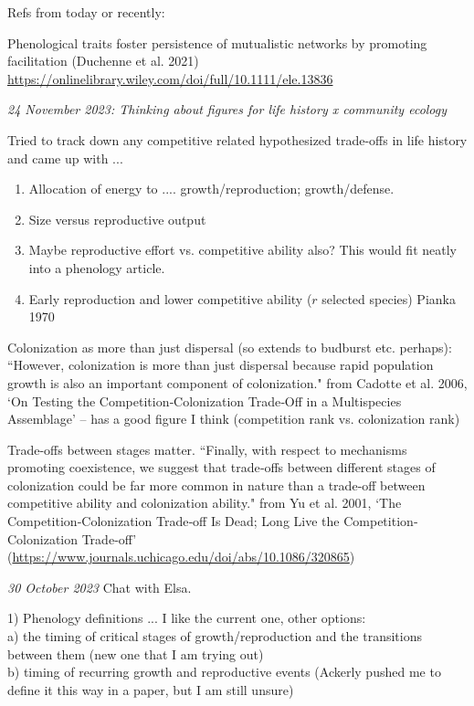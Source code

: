 \documentclass[11pt]{article}
\begin{document}
Refs from today or recently:

Phenological traits foster persistence of mutualistic networks by promoting facilitation (Duchenne et al. 2021) \url{https://onlinelibrary.wiley.com/doi/full/10.1111/ele.13836}

\emph{24 November 2023: Thinking about figures for life history x community ecology} 

Tried to track down any competitive related hypothesized trade-offs in life history and came up with ... 
\begin{enumerate}
\item Allocation of energy to .... growth/reproduction; growth/defense.
\item Size versus reproductive output
\item Maybe reproductive effort vs. competitive ability also? This would fit neatly into a phenology article. 
\item Early reproduction and lower competitive ability ($r$ selected species) Pianka 1970
\end{enumerate}

Colonization as more than just dispersal (so extends to budburst etc. perhaps): ``However, colonization is more than just dispersal because rapid population growth is also an important component of colonization." from Cadotte et al. 2006, `On Testing the Competition‐Colonization Trade‐Off in a Multispecies Assemblage' -- has a good figure I think (competition rank vs. colonization rank)

Trade-offs between stages matter. ``Finally, with respect to mechanisms promoting coexistence, we suggest that trade‐offs between different stages of colonization could be far more common in nature than a trade‐off between competitive ability and colonization ability." from Yu et al. 2001, `The Competition‐Colonization Trade‐off Is Dead; Long Live the Competition‐Colonization Trade‐off' (\url{https://www.journals.uchicago.edu/doi/abs/10.1086/320865})

\emph{30 October 2023} Chat with Elsa.

1) Phenology definitions ... I like the current one, other options:\\
a) the timing of critical stages of growth/reproduction and the transitions between them (new one that I am trying out)\\
b) timing of recurring growth and reproductive events (Ackerly pushed me to define it this way in a paper, but I am still unsure)\\
\end{document}
